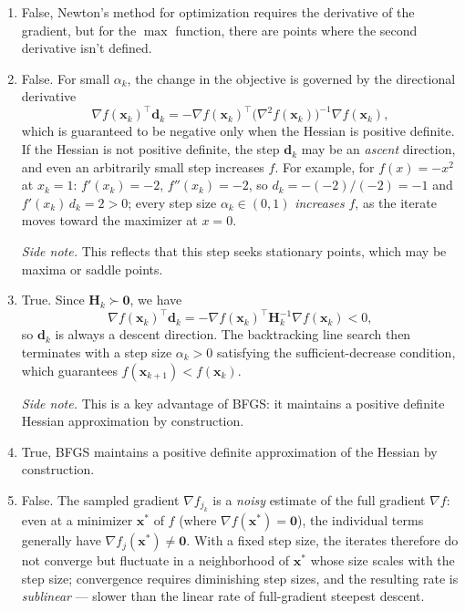 \begin{solution}
\begin{enumerate}[label=(\alph*)]
        \emph{Side note.} For example, for $f(\mathbf{x}) = x_1^2 + 10x_2^2$, an exact line search from a generic starting point does not land on the minimizer; the gradient at the new point is nonzero (and orthogonal to the previous direction), which is what produces the characteristic zig-zag path of steepest descent.
        \item False, Newton's method for optimization requires the derivative of the gradient, but for the $\max$ function, there are points where the second derivative isn't defined.
        \item  False. For small $\alpha_k$, the change in the objective is governed by the directional derivative
        \[
            \nabla f(\mathbf{x}_k)^\top \mathbf{d}_k = -\nabla f(\mathbf{x}_k)^\top \big(\nabla^2 f(\mathbf{x}_k)\big)^{-1} \nabla f(\mathbf{x}_k),
        \]
        which is guaranteed to be negative only when the Hessian is positive definite. If the Hessian is not positive definite, the step $\mathbf{d}_k$ may be an \emph{ascent} direction, and even an arbitrarily small step increases $f$. For example, for $f(x) = -x^2$ at $x_k = 1$: $f'(x_k) = -2$, $f''(x_k) = -2$, so $d_k = -(-2)/(-2) = -1$ and $f'(x_k)\, d_k = 2 > 0$; every step size $\alpha_k \in (0, 1)$ \emph{increases} $f$, as the iterate moves toward the maximizer at $x = 0$.

        \emph{Side note.} This reflects that this step seeks stationary points, which may be maxima or saddle points.
        \item  True. Since $\mathbf{H}_k \succ \mathbf{0}$, we have
        \[
            \nabla f(\mathbf{x}_k)^\top \mathbf{d}_k = -\nabla f(\mathbf{x}_k)^\top \mathbf{H}_k^{-1} \nabla f(\mathbf{x}_k) < 0,
        \]
        so $\mathbf{d}_k$ is always a descent direction. The backtracking line search then terminates with a step size $\alpha_k > 0$ satisfying the sufficient-decrease condition, which guarantees $f(\mathbf{x}_{k+1}) < f(\mathbf{x}_k)$.

        \emph{Side note.} This is a key advantage of BFGS: it maintains a positive definite Hessian approximation by construction.
        \item True, BFGS maintains a positive definite approximation of the Hessian by construction.
        \item  False. The sampled gradient $\nabla f_{j_k}$ is a \emph{noisy} estimate of the full gradient $\nabla f$: even at a minimizer $\mathbf{x}^*$ of $f$ (where $\nabla f(\mathbf{x}^*) = \mathbf{0}$), the individual terms generally have $\nabla f_j(\mathbf{x}^*) \neq \mathbf{0}$. With a fixed step size, the iterates therefore do not converge but fluctuate in a neighborhood of $\mathbf{x}^*$ whose size scales with the step size; convergence requires diminishing step sizes, and the resulting rate is \emph{sublinear} --- slower than the linear rate of full-gradient steepest descent.


\end{enumerate}
\end{solution}
